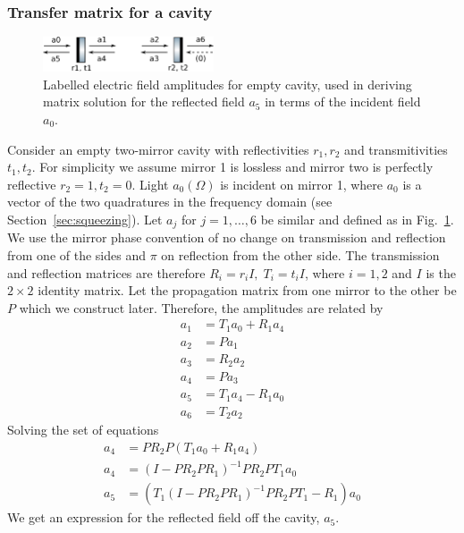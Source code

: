 \documentclass[aps,pra,superscriptaddress,reprint,nofootinbib]{revtex4-1}
\begin{document}
\subsubsection{Transfer matrix for a cavity}

\begin{figure}[ht]
	\begin{center}
	\includegraphics[width=0.45\textwidth]{figures/empty_cavity_amplitudes.pdf}
	\end{center}
	\caption{Labelled electric field amplitudes for empty cavity, used in deriving matrix solution for the reflected field $a_5$ in terms of the incident field $a_0$.}
	\label{fig:empty_cavity_amplitudes}
\end{figure}

Consider an empty two-mirror cavity with reflectivities $r_1, r_2$ and transmitivities $t_1, t_2$. For simplicity we assume mirror 1 is lossless and mirror two is perfectly reflective $r_2 = 1, t_2 = 0$. Light $a_0(\Omega)$ is incident on mirror 1, where $a_0$ is a vector of the two quadratures in the frequency domain (see Section~\ref{sec:squeezing}). Let $a_j$ for $j = 1, \ldots, 6$ be similar and defined as in Fig.~\ref{fig:empty_cavity_amplitudes}. We use the mirror phase convention of no change on transmission and reflection from one of the sides and $\pi$ on reflection from the other side. The transmission and reflection matrices are therefore $R_i = r_i I,\; T_i = t_i I$, where $i = 1, 2$ and $I$ is the $2 \times 2$ identity matrix. Let the propagation matrix from one mirror to the other be $P$ which we construct later. Therefore, the amplitudes are related by
\begin{align}
a_1 &= T_1 a_0 + R_1 a_4\\
a_2 &= P a_1\nonumber\\
a_3 &= R_2 a_2 \nonumber\\
a_4 &= P a_3\nonumber\\
a_5 &= T_1 a_4 - R_1 a_0\nonumber\\
a_6 &= T_2 a_2\nonumber
\end{align}
Solving the set of equations
\begin{align}
a_4 &= P R_2 P (T_1 a_0 + R_1 a_4) \\
a_4 &= (I - P R_2 P R_1)^{-1} P R_2 P T_1 a_0 \nonumber\\
a_5 &= \left(T_1 (I - P R_2 P R_1)^{-1} P R_2 P T_1 - R_1\right) a_0\nonumber
\end{align}
We get an expression for the reflected field off the cavity, $a_5$.
\end{document}

